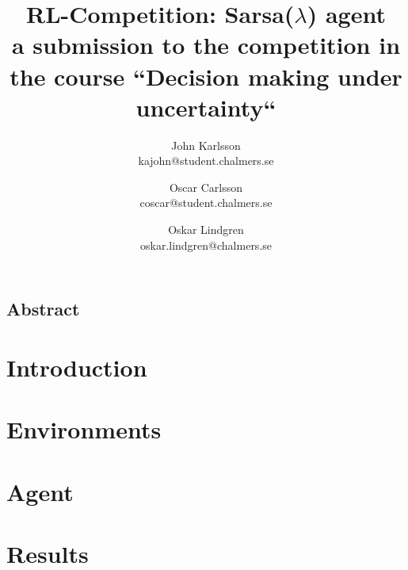 \documentclass[letterpaper,twocolumn,10pt]{article}
\begin{document}
\date{}

\title{ RL-Competition: Sarsa($\lambda$) agent\\ \small a submission to the
    competition in the course ``Decision making under uncertainty``}

\author{
{\rm John Karlsson}\\
kajohn@student.chalmers.se
\and
{\rm Oscar Carlsson}\\
coscar@student.chalmers.se
\and
{\rm Oskar Lindgren}\\
oskar.lindgren@chalmers.se
}

\maketitle

\thispagestyle{empty}

\subsection*{Abstract}


\section{Introduction}


\section{Environments}


\section{Agent}


\section{Results}


{\footnotesize 
}

\theendnotes
\end{document}

